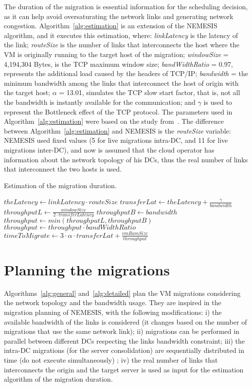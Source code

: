 The duration of the migration is essential information for the scheduling decision, as it can help avoid oversaturating the network links and generating network congestion. Algorithm~\ref{alg:estimation} is an extension of the NEMESIS algorithm, and it executes this estimation, where: \textit{linkLatency} is the latency of the link; \textit{routeSize} is the number of links that interconnects the host where the VM is originally running to the target host of the migration; \mbox{\textit{windowSize}} = 4,194,304 Bytes, is the TCP maximum window size; \textit{bandWidthRatio} = 0.97, represents the additional load caused by the headers of TCP/IP; \textit{bandwidth} = the minimum bandwidth among the links that interconnect the host of origin with the target host; $\alpha$ = 13.01, simulates the TCP slow start factor, that is, not all the bandwidth is instantly available for the communication; and $\gamma$ is used to represent the Bottleneck effect of the TCP protocol. The parameters used in Algorithm~\ref{alg:estimation} were based on the study from~\citet{velho2013simgridparameters}. The difference between Algorithm~\ref{alg:estimation}  and NEMESIS is the \textit{routeSize} variable: NEMESIS used fixed values (5 for live migrations intra-DC, and 11 for live migrations inter-DC), and now is assumed that the cloud operator has information about the network topology of his DCs, thus the real number of links that interconnect the two hosts is used.

\begin{algorithm}
\begin{algorithmic}
\caption{Estimation of the migration duration.}\label{alg:estimation}
\State $theLatency \gets linkLatency \cdot routeSize$
\State $transferLat \gets theLatency + \frac{\gamma}{bandwidth}$
\State $throughputL \gets \frac{windowSize}{2 \cdot transferLatency}$
\State $throughputB \gets bandwidth$
\State $throughput \gets min(throughputL, throughputB)$
\State $throughput \gets throughput 
\cdot bandWidthRatio$
\State $timeToMigrate \gets  3 \cdot \alpha \cdot transferLat + \frac{vmRamSize}{throughput}$ 
\end{algorithmic}
\end{algorithm}

\section{Planning the migrations}
\label{sec:modeling_smargreens}

Algorithms~\ref{alg:general} and~\ref{alg:detailed} plan the VM migrations considering the network topology and the bandwidth usage. They are inspired in the migration planning of NEMESIS, with the following modifications: i) the available bandwidth of the links is considered (it changes based on the number of migrations that use the same network link); ii) migrations can be performed in parallel between different DCs respecting the links bandwidth constraint; iii) the intra-DC migrations (for the server consolidation) are sequentially distributed in time (do not execute simultaneously) ; iv) the real number of links that interconnects the origin and the target server is used as input for the estimation algorithm of the migration duration. 

